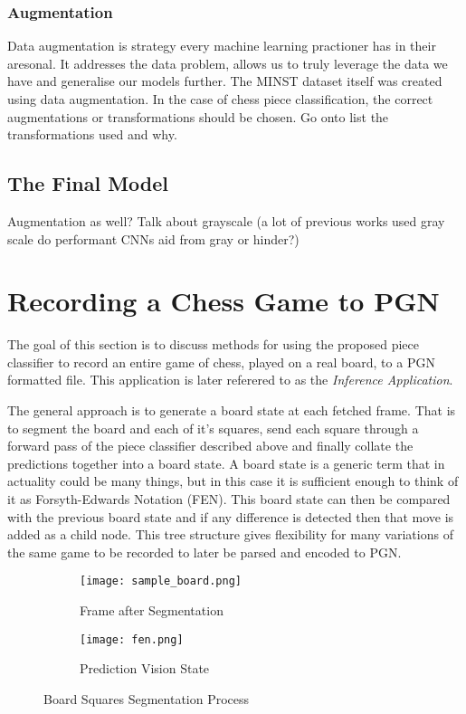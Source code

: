 \subsubsection{Augmentation}
Data augmentation is strategy every machine learning practioner has in their aresonal.  It addresses the data problem, allows us to truly 
leverage the data we have and generalise our models further.  The MINST \cite{} dataset itself was created using data augmentation.
In the case of chess piece classification, the correct augmentations or transformations should be chosen.
Go onto list the transformations used and why.

\subsection{The Final Model}
\label{the model}
Augmentation as well?
Talk about grayscale (a lot of previous works used gray scale do performant CNNs aid from gray or hinder?)

\section{Recording a Chess Game to PGN}
The goal of this section is to discuss methods for using the proposed piece classifier to record an entire game of chess, played on a real board, 
to a PGN formatted file.  This application is later referered to as the \textit{Inference Application}.

The general approach is to generate a board state at each fetched frame.  That is to segment the board and each of it's squares, send each square 
through a forward pass of the piece classifier described above and finally collate the predictions together into a board state.  A board state is 
a generic term that in actuality could be many things, but in this case it is sufficient enough to think of it as Forsyth-Edwards Notation (FEN).
This board state can then be compared with the previous board state and if any difference is detected then that move is added as a child node.
This tree structure gives flexibility for many variations of the same game to be recorded to later be parsed and encoded to PGN.


\begin{figure}[h]
    \centering
    \begin{subfigure}[b]{0.48\textwidth}
        \centering
        \texttt{[image: sample\_board.png]}
        \caption{Frame after Segmentation}
    \end{subfigure}
    \hfill
    \begin{subfigure}[b]{0.48\textwidth}
        \centering
        \texttt{[image: fen.png]}
        \caption{Prediction Vision State}
    \end{subfigure}
\caption{Board Squares Segmentation Process}
\label{fig:visionstate}
\end{figure}

